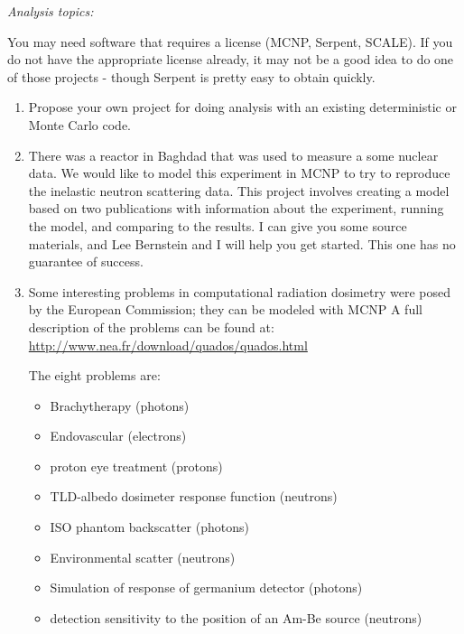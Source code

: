 \documentclass[12pt]{article}
\begin{document}
\begin{center}
\textit{Analysis topics:}
\end{center}
You may need software that requires a license (MCNP, Serpent, SCALE). If you do not have the appropriate license already, it may not be a good idea to do one of those projects - though Serpent is pretty easy to obtain quickly.

\begin{enumerate}
\item Propose your own project for doing analysis with an existing deterministic or Monte Carlo code. 

\item There was a reactor in Baghdad that was used to measure a some nuclear data. We would like to model this experiment in MCNP to try to reproduce the inelastic neutron scattering data. This project involves creating a model based on two publications with information about the experiment, running the model, and comparing to the results. I can give you some source materials, and Lee Bernstein and I will help you get started. This one has no guarantee of success.  

\item Some interesting problems in computational radiation dosimetry were posed by the European Commission; they can be modeled with MCNP A full description of the problems can be found at: \href{http://www.nea.fr/download/quados/quados.html}{http://www.nea.fr/download/quados/quados.html}

The eight problems are: 
\begin{itemize}
\item Brachytherapy (photons)
\item Endovascular (electrons)
\item proton eye treatment (protons)
\item TLD-albedo dosimeter response function (neutrons)
\item ISO phantom backscatter (photons)
\item Environmental scatter (neutrons)
\item Simulation of response of germanium detector (photons)
\item detection sensitivity to the position of an Am-Be source (neutrons)
\end{itemize}	
%
\end{enumerate}
\end{document}

